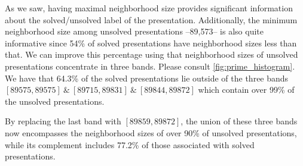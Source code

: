 
As we saw, having maximal neighborhood size provides significant information about the solved/unsolved label of the presentation.
Additionally, the minimum neighborhood size among unsolved presentations --89,573-- is also quite informative since 54\% of solved presentations have neighborhood sizes less than that.
We can improve this percentage using that neighborhood sizes of unsolved presentations concentrate in three bands.
Please consult \cref{fig:prime_histogram}.
We have that 64.3\% of the solved presentations lie outside of the three bands $[89575, 89575]\ \& \ [89715, 89831]\ \& \ [89844, 89872]$ which contain over 99\% of the unsolved presentations.

By replacing the last band with $[89859,89872]$, the union of these three bands now encompasses the neighborhood sizes of over 90\% of unsolved presentations, while its complement includes 77.2\% of those associated with solved presentations.

